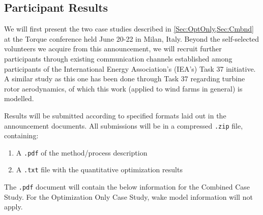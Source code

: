 \documentclass[]{aiaa-tc}
\begin{document}
\subsection{Participant Results}

We will first present the two case studies described in \cref{Sec:OptOnly,Sec:Cmbnd} at the Torque conference held June 20-22 in Milan, Italy. Beyond the self-selected volunteers we acquire from this announcement, we will recruit further participants through existing communication channels established among participants of the International Energy Association's (IEA's) Task 37 initiative. A similar study as this one has been done through Task 37 regarding turbine rotor aerodynamics, of which this work (applied to wind farms in general) is modelled.

Results will be submitted according to specified formats laid out in the announcement documents. All submissions will be in a compressed \texttt{.zip} file, containing:

\begin{enumerate}
	\item A \texttt{.pdf} of the method/process description
	\item A \texttt{.txt} file with the quantitative optimization results
\end{enumerate}

The \texttt{.pdf} document will contain the below information for the Combined Case Study. For the Optimization Only Case Study, wake model information will not apply.
\end{document}
